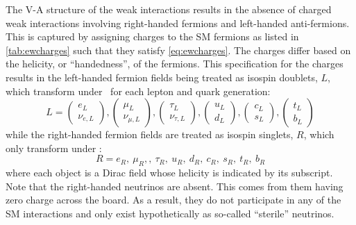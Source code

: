 The V-A structure of the weak interactions
results in the absence of charged weak interactions involving right-handed
fermions and left-handed anti-fermions.
This is captured
by assigning charges to the SM fermions 
as listed in \tab\ref{tab:ewcharges}
such that they satisfy \eqn\eqref{eq:ewcharges}.
The charges differ based on the helicity, or ``handedness'',
of the fermions.
This specification for the charges results in the 
left-handed fermion fields being treated as isospin doublets, $L$, 
which transform under \sutwo~for each lepton and quark generation:
\begin{equation}
L = 
\begin{pmatrix} e_L \\ \nu_{e,L} \end{pmatrix},
\begin{pmatrix} \mu_L \\ \nu_{\mu,L} \end{pmatrix},
\begin{pmatrix} \tau_L \\ \nu_{\tau,L} \end{pmatrix},
\begin{pmatrix} u_L \\ d_{L} \end{pmatrix},
\begin{pmatrix} c_L \\ s_{L} \end{pmatrix},
\begin{pmatrix} t_L \\ b_{L} \end{pmatrix}
\end{equation}
while the right-handed fermion fields are treated as isospin singlets, $R$, 
which only transform under \uone:
\begin{equation}
R = e_R,~\mu_R,,~\tau_R,~u_R,~d_R,~c_R,~s_R,~t_R,~b_R
\end{equation}
where each object is a Dirac field whose helicity is indicated by 
its subscript.
Note that the right-handed neutrinos are absent.
This comes from them having zero charge across the board.
As a result, they do not participate in any of the SM interactions
and only exist hypothetically as so-called ``sterile'' neutrinos.


